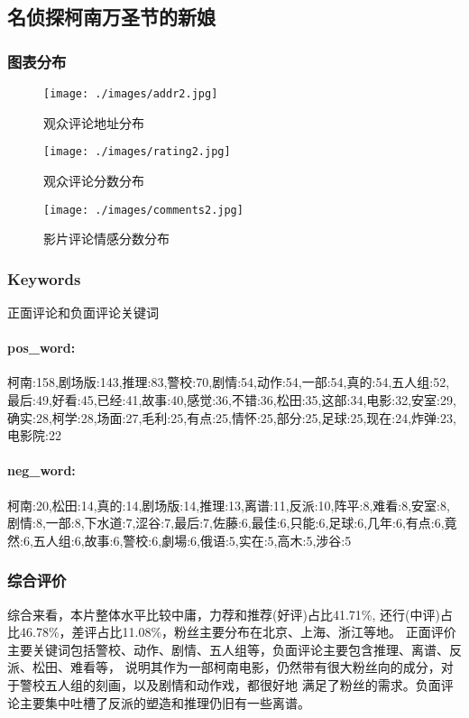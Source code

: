 \documentclass[12pt]{article}
\begin{document}
\subsection{名侦探柯南\:万圣节的新娘}
\subsubsection{图表分布}
\begin{figure}[H]
    \centering
    \begin{minipage}[t]{0.48\textwidth}
    \centering
    \texttt{[image: ./images/addr2.jpg]}
    \caption{观众评论地址分布}
    \end{minipage}
    \begin{minipage}[t]{0.48\textwidth}
    \centering
    \texttt{[image: ./images/rating2.jpg]}
    \caption{观众评论分数分布}
    \end{minipage}
\end{figure}

\begin{figure}[H]
    \centering
    \texttt{[image: ./images/comments2.jpg]}
    \caption{影片评论情感分数分布} 
\end{figure}
\subsubsection*{Keywords}
正面评论和负面评论关键词
\paragraph*{pos\_word:}
柯南:158,剧场版:143,推理:83,警校:70,剧情:54,动作:54,一部:54,真的:54,五人组:52,最后:49,好看:45,已经:41,故事:40,感觉:36,不错:36,松田:35,这部:34,电影:32,安室:29,确实:28,柯学:28,场面:27,毛利:25,有点:25,情怀:25,部分:25,足球:25,现在:24,炸弹:23,电影院:22
\paragraph*{neg\_word:}
柯南:20,松田:14,真的:14,剧场版:14,推理:13,离谱:11,反派:10,阵平:8,难看:8,安室:8,剧情:8,一部:8,下水道:7,涩谷:7,最后:7,佐藤:6,最佳:6,只能:6,足球:6,几年:6,有点:6,竟然:6,五人组:6,故事:6,警校:6,劇場:6,俄语:5,实在:5,高木:5,涉谷:5

\subsubsection*{综合评价}
综合来看，本片整体水平比较中庸，力荐和推荐(好评)占比41.71\%,
还行(中评)占比46.78\%，差评占比11.08\%，粉丝主要分布在北京、上海、浙江等地。
正面评价主要关键词包括警校、动作、剧情、五人组等，负面评论主要包含推理、离谱、反派、松田、难看等，
说明其作为一部柯南电影，仍然带有很大粉丝向的成分，对于警校五人组的刻画，以及剧情和动作戏，都很好地
满足了粉丝的需求。负面评论主要集中吐槽了反派的塑造和推理仍旧有一些离谱。
\end{document}
